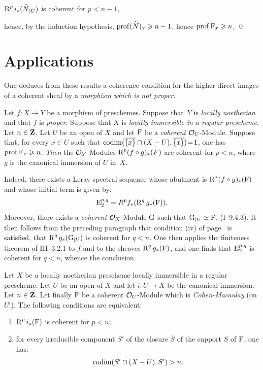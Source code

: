 $\operatorname{R}^pi_\ast(\widetilde{N}{}_{|U})$ is coherent for $p<n-1$,

\noindent hence, by the induction hypothesis, $\operatorname{prof}(\widetilde{N})_x\geqslant n-1$, hence $\operatorname{prof} {\operatorname{F}}_x\geqslant n$, \qed

\section{Applications} \label{VIII.3}

One deduces from these results a coherence condition for the higher direct images of a coherent sheaf by a \emph{morphism which is not proper}.

\begin{theorem} \label{VIII.3.1}
Let $f\colon X\to Y$ be a morphism of preschemes. Suppose that~$Y$ is \emph{locally noetherian} and that $f$ is \emph{proper}. Suppose that $X$ is \emph{locally immersible in a regular prescheme}. Let $n\in\mathbf{Z}$. Let $U$ be an open of $X$ and let ${\operatorname{F}}$ be a \emph{coherent} ${\mathcal O}_U$-Module. Suppose that, for every $x\in U$ such that \hbox{$\operatorname{codim}(\overline{\{x\}}\cap (X-U), \overline{\{x\}})\!=\!1$}, one has $\operatorname{prof}{\operatorname{F}}_x\geqslant n$. \emph{Then} the ${\mathcal O}_Y$-Modules \hbox{$\operatorname{R}^p(f\circ g)_\ast(F)$} are coherent for $p<n$, where $g$ is the canonical immersion of $U$ in~$X$.
\end{theorem}

Indeed, there exists a Leray spectral sequence whose abutment is $\operatorname{R}^\ast(f\circ g)_\ast({\operatorname{F}})$ and whose initial term is given by:
\[
\operatorname{E}^{p, q}_2=R^pf_\ast(\operatorname{R}^qg_\ast({\operatorname{F}})).
\]
Moreover, there exists a \emph{coherent} $\mathcal{O}_X$-Module ${\operatorname{G}}$ such that ${\operatorname{G}}{}_{|U}\simeq {\operatorname{F}}$, (\EGA I~9.4.3). It then follows from the preceding paragraph that condition (iv) of page~\pageref{condition} is satisfied, \ie that $\operatorname{R}^qg_\ast({\operatorname{G}}{}_{|U})$ is coherent for $q<n$. One then applies the finiteness theorem of \EGA III~3.2.1 to $f$ and to the sheaves $\operatorname{R}^qg_\ast({\operatorname{F}})$, and one finds that $\operatorname{E}^{p, q}_2$ is coherent for $q<n$, whence the conclusion.

\begin{proposition} \label{VIII.3.2} Let $X$ be a locally noetherian prescheme locally immersible in a regular prescheme. Let $U$ be an open of $X$ and let $i\colon U\to X$ be the canonical immersion. Let $n\in\mathbf{Z}$. Let finally ${\operatorname{F}}$ be a coherent ${\mathcal O}_U$-Module which is \emph{Cohen-Macaulay} (on $U$!). The following conditions are equivalent:
\begin{enumerate}
\item[(a)]
$\operatorname{R}^pi_\ast({\operatorname{F}})$ is coherent for $p<n$;

\item[(b)]
for every irreducible component $S'$ of the closure $\overline S$ of the support $S$ of ${\operatorname{F}}$, one has:
\[
\operatorname{codim} (S'\cap (X-U), S')>n.
\]
\end{enumerate}
\end{proposition}

